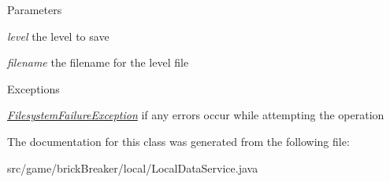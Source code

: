 \begin{DoxyParams}{Parameters}
\item[{\em level}]the level to save \item[{\em filename}]the filename for the level file\end{DoxyParams}

\begin{DoxyExceptions}{Exceptions}
\item[{\em \hyperlink{classbrick_breaker_1_1local_1_1_filesystem_failure_exception}{FilesystemFailureException}}]if any errors occur while attempting the operation \end{DoxyExceptions}


The documentation for this class was generated from the following file:\begin{DoxyCompactItemize}
\item 
src/game/brickBreaker/local/LocalDataService.java\end{DoxyCompactItemize}
